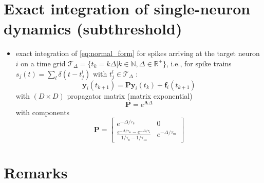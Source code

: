 \documentclass[10pt,a4paper,twoside,american]{article}
\theoremstyle{definitionstyle}
\newcommand{\tauM}{\tau_\text{m}}
\newcommand{\tauS}{\tau_\text{s}}
\begin{document}
\section{Exact integration of  single-neuron dynamics (subthreshold)}
\label{sec:exact_integration}

\begin{itemize}
\item exact integration of \eqref{eq:normal_form} for spikes arriving at the target neuron $i$ on a time grid
  \mbox{$\mathcal{T}_\Delta= \{t_k=k\Delta{}|k\in\mathbb{N},\Delta\in\mathbb{R}^+\}$}, i.e.,
  for spike trains \mbox{$s_j(t) = \sum_l\delta(t-t_j^l)$} with $t_j^l\in\mathcal{T}_\Delta$ \citep{Rotter99_381}:
  \begin{equation}
    \label{eq:exact_integration}
    \bm{y}_i(t_{k+1}) = \bm{P}\bm{y}_i(t_k) + \bm{f}_i(t_{k+1})
  \end{equation}
  with $(D\times{}D)$ propagator matrix (matrix exponential)
  \begin{equation}
    \label{eq:matrix_exponential}
    \bm{P} = e^{\bm{A}\Delta}
  \end{equation}
  with components 
  \begin{equation}
	\bm{P} =
	\begin{bmatrix}
      		e^{-\Delta/\tauS} 					     & 0\\
		\frac{e^{-\Delta/\tauM}-e^{-\Delta/\tauS}}{1/\tauS-1/\tauM}  & e^{-\Delta/\tauM}
    	\end{bmatrix}
  \end{equation}
  \citep[see Sec.\,3.2.2 in][]{Rotter99_381}
\end{itemize}

\clearpage
\section{Remarks}
\label{sec:remarks}
\end{document}

